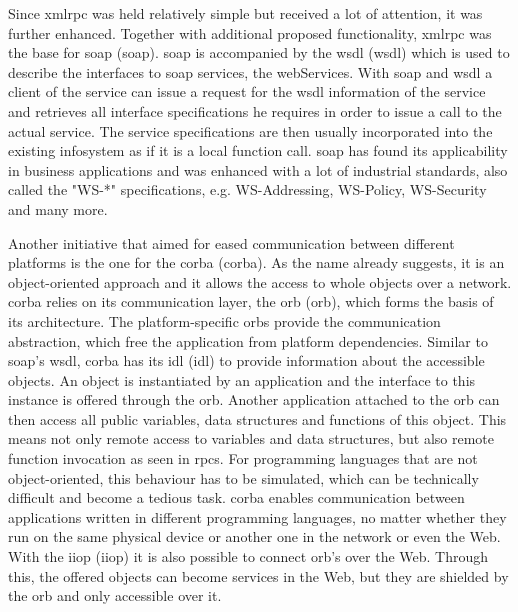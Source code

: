 Since \textrm{\acrshort{xmlrpc}} was held relatively simple but received a lot of attention, it was further enhanced.
Together with additional proposed functionality, \textrm{\acrshort{xmlrpc}} was the base for \textrm{\acrlong{soap}} (\textrm{\acrshort{soap}})\cite{box2000simple}.
\textrm{\acrshort{soap}} is accompanied by the \textrm{\acrlong{wsdl} (\acrshort{wsdl})}\cite{christensen2001web} which is used to describe the interfaces to \acrshort{soap} services, the \textrm{\glspl{webService}}.
With \textrm{\acrshort{soap}} and \textrm{\acrshort{wsdl}} a client of the service can issue a request for the \textrm{\acrshort{wsdl}} information of the service and retrieves all interface specifications he requires in order to issue a call to the actual service.
The service specifications are then usually incorporated into the existing \textrm{\gls{infosystem}} as if it is a local function call.
\textrm{\acrshort{soap}} has found its applicability in business applications\cite{journals/itpro/BarrosD06} and was enhanced with a lot of industrial standards, also called the "WS-*" specifications, e.g. WS-Addressing, WS-Policy, WS-Security and many more.

Another initiative that aimed for eased communication between different platforms is the one for the \textrm{\acrlong{corba} (\acrshort{corba})}\cite{dec1991common}.
As the name already suggests, it is an object-oriented approach and it allows the access to whole objects over a network.
\textrm{\acrshort{corba}} relies on its communication layer, the \textrm{\acrlong{orb} (\acrshort{orb})}, which forms the basis of its architecture.
The platform-specific \textrm{\acrshort{orb}}s provide the communication abstraction, which free the application from platform dependencies.
Similar to \textrm{\acrshort{soap}}'s \textrm{\acrshort{wsdl}}, \textrm{\acrshort{corba}} has its \textrm{\acrlong{idl} (\acrshort{idl})} to provide information about the accessible objects.
An object is instantiated by an application and the interface to this instance is offered through the \textrm{\acrshort{orb}}.
Another application attached to the \textrm{\acrshort{orb}} can then access all public variables, data structures and functions of this object.
This means not only remote access to variables and data structures, but also remote function invocation as seen in \textrm{\acrshort{rpc}}s.
For programming languages that are not object-oriented, this behaviour has to be simulated, which can be technically difficult and become a tedious task.
\textrm{\acrshort{corba}} enables communication between applications written in different programming languages, no matter whether they run on the same physical device or another one in the network or even the Web.
With the \textrm{\acrlong{iiop} (\acrshort{iiop})} it is also possible to connect \textrm{\acrshort{orb}}'s over the Web.
Through this, the offered objects can become services in the Web, but they are shielded by the \textrm{\acrshort{orb}} and only accessible over it.


